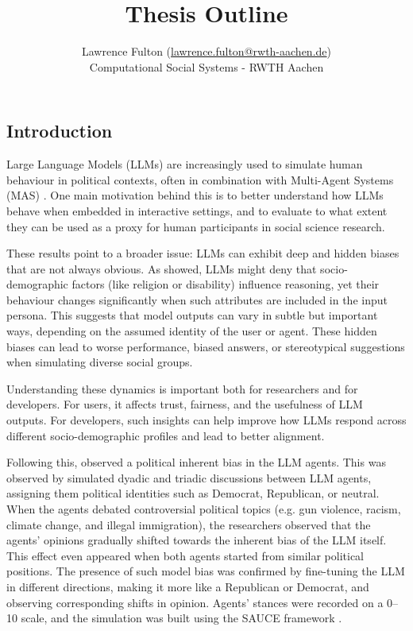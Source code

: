 \documentclass[12pt]{article}
\title{Thesis Outline}
\author{Lawrence Fulton (\url{lawrence.fulton@rwth-aachen.de})\\ Computational Social Systems -  RWTH Aachen}
\begin{document}
\maketitle

\begin{multicols}{2}


\section{Introduction}

Large Language Models (LLMs) are increasingly used to simulate human behaviour in political contexts, often in combination with Multi-Agent Systems (MAS) \cite{zhao2023competeai, kaiya2023lyfe}. One main motivation behind this is to better understand how LLMs behave when embedded in interactive settings, and to evaluate to what extent they can be used as a proxy for human participants in social science research.

These results point to a broader issue: LLMs can exhibit deep and hidden biases that are not always obvious. As  showed, LLMs might deny that socio-demographic factors (like religion or disability) influence reasoning, yet their behaviour changes significantly when such attributes are included in the input persona. This suggests that model outputs can vary in subtle but important ways, depending on the assumed identity of the user or agent. These hidden biases can lead to worse performance, biased answers, or stereotypical suggestions when simulating diverse social groups.

Understanding these dynamics is important both for researchers and for developers. For users, it affects trust, fairness, and the usefulness of LLM outputs. For developers, such insights can help improve how LLMs respond across different socio-demographic profiles and lead to better alignment.


Following this,  observed a political inherent bias in the LLM agents. This was observed by simulated dyadic and triadic discussions between LLM agents, assigning them political identities such as Democrat, Republican, or neutral. When the agents debated controversial political topics (e.g. gun violence, racism, climate change, and illegal immigration), the researchers observed that the agents’ opinions gradually shifted towards the inherent bias of the LLM itself. This effect even appeared when both agents started from similar political positions. The presence of such model bias was confirmed by fine-tuning the LLM in different directions, making it more like a Republican or Democrat, and observing corresponding shifts in opinion. Agents’ stances were recorded on a 0–10 scale, and the simulation was built using the SAUCE framework \cite{neuberger2024sauce}.



\end{multicols}
\end{document}
